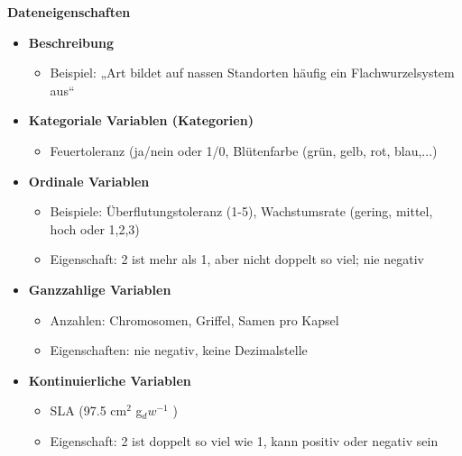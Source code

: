 \textbf{Dateneigenschaften}
\begin{itemize}
	\item \textbf{Beschreibung}
	\begin{itemize}
		\item Beispiel: „Art bildet auf nassen Standorten häufig ein Flachwurzelsystem aus“
	\end{itemize}
	\item \textbf{Kategoriale Variablen (Kategorien)}
	\begin{itemize}
		\item Feuertoleranz (ja/nein oder 1/0, Blütenfarbe (grün, gelb, rot, blau,...)
	\end{itemize}
	\item \textbf{Ordinale Variablen}
	\begin{itemize}
		\item Beispiele: Überflutungstoleranz (1-5), Wachstumsrate (gering, mittel, hoch oder 1,2,3)
		\item Eigenschaft: 2 ist mehr als 1, aber nicht doppelt so viel; nie negativ
	\end{itemize}
	\item \textbf{Ganzzahlige Variablen}
	\begin{itemize}
		\item Anzahlen: Chromosomen, Griffel, Samen pro Kapsel
		\item Eigenschaften: nie negativ, keine Dezimalstelle
	\end{itemize}
	\item \textbf{Kontinuierliche Variablen}
	\begin{itemize}
		\item SLA (97.5 cm$^2$ g$_dw^{-1}$ )
		\item Eigenschaft: 2 ist doppelt so viel wie 1, kann positiv oder negativ sein
	\end{itemize}
\end{itemize}
